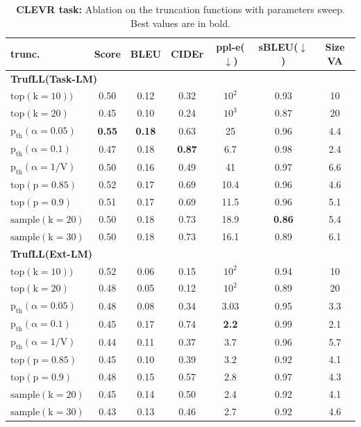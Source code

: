 \documentclass{article}
\newcommand{\algo}{TrufLL\xspace}
\newcommand{\topkarg}[1]{\operatorname{top(k=#1)}}
\newcommand{\topparg}[1]{\operatorname{top(p=#1)}}
\newcommand{\ptharg}[1]{\operatorname{p_{th}(\alpha=#1)}}
\newcommand{\samplearg}[1]{\operatorname{sample(k=#1)}}
\begin{document}
\begin{table}[h!]
\caption{\small \textbf{CLEVR task:} Ablation on the truncation functions with  parameters sweep. Best values are in bold.}
\label{app:table:abl:CLEVR_trunc_functions_sweep}
\centering\hspace*{-0.5cm}
\small
\begin{tabular}{l|c|ccc|cc}
trunc. & Score & BLEU & CIDEr
& ppl-e($\downarrow$) & sBLEU($\downarrow$) & Size VA \\\toprule
\multicolumn{3}{l}{\textbf{\algo(Task-LM)}} \\
\hline
$\topkarg{10)}$ & 0.50 & 0.12 & 0.32 & $10^2$ &0.93 & 10\\
$\topkarg{20}$ & 0.45& 0.10&0.24&$10^3$&0.87& 20 \\
$\ptharg{0.05}$ & \textbf{0.55}&\textbf{0.18}&0.63& 25 & 0.96 &4.4\\
$\ptharg{0.1}$  & 0.47 & 0.18 & \textbf{0.87} & 6.7 & 0.98 &2.4\\
$\ptharg{1/V}$ & 0.50 & 0.16 & 0.49 & 41 & 0.97 &6.6 \\
$\topparg{0.85}$ & 0.52 &	0.17 & 0.69 & 10.4 & 0.96&4.6 \\
$\topparg{0.9}$ & 0.51&	0.17&0.69&11.5 & 0.96 &5.1\\
$\samplearg{20}$ & 0.50&	0.18&	0.73&	18.9 &	\textbf{0.86}&5.4 \\
$\samplearg{30}$ & 0.50 & 0.18 & 0.73 & 16.1 & 0.89&6.1 \\
\toprule
\multicolumn{3}{l}{\textbf{\algo(Ext-LM)}} \\
\hline
$\topkarg{10)}$  & 0.52 & 0.06 & 0.15 & $10^2$ & 0.94 & 10\\
$\topkarg{20}$  & 0.48 & 0.05 & 0.12 & $10^2$ & 0.89 &20\\
$\ptharg{0.05}$ &  0.48&	0.08&	0.34&	3.03&	0.95 &3.3 \\
$\ptharg{0.1}$ &  0.45&	0.17&	0.74&	\textbf{2.2} &	0.99 &2.1 \\
$\ptharg{1/V}$ &  0.44&	0.11&	0.37&	3.7 &	0.96 & 5.7\\
$\topparg{0.85}$ & 0.45& 0.10 & 0.39 & 3.2 &	0.92 & 4.1 \\
$\topparg{0.9}$ & 0.48 & 0.15 & 0.57 & 2.8 & 0.97 & 4.3\\
$\samplearg{20}$ & 0.45&	0.14&	0.50&	2.4 &	0.92 & 4.1 \\
$\samplearg{30}$ & 0.43&	0.13&	0.46&	2.7 &	0.92 & 4.6 \\
\bottomrule
\end{tabular}
\end{table}
\end{document}
